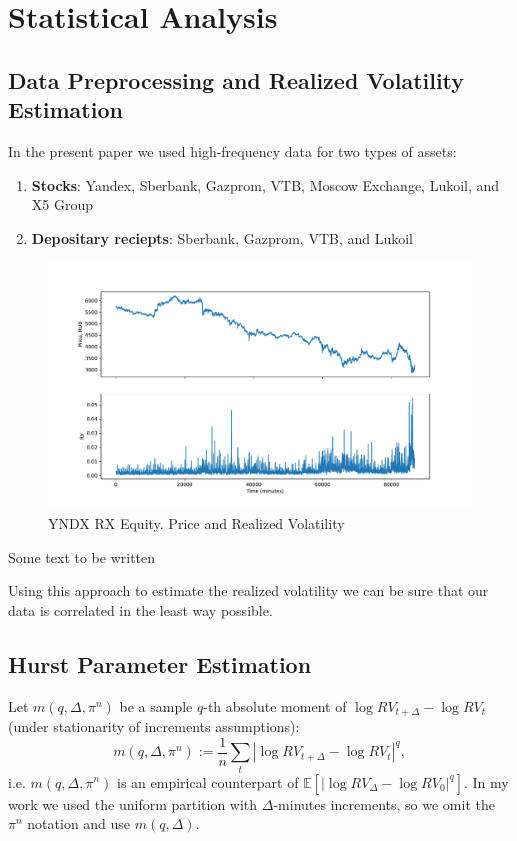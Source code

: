 \section{Statistical Analysis}
    \subsection{Data Preprocessing and Realized Volatility Estimation}
        In the present paper we used high-frequency data for two types of assets:
        \begin{enumerate}
            \item\textbf{Stocks}: Yandex, Sberbank, Gazprom, VTB, Moscow Exchange, Lukoil, and X5 Group
            \item\textbf{Depositary reciepts}: Sberbank, Gazprom, VTB, and Lukoil
        \end{enumerate}

        \begin{figure}[htbp]
            \includegraphics[width=\textwidth]{fig/YNDX RX Equity RVol.pdf}
            \caption{YNDX RX Equity. Price and Realized Volatility}
        \end{figure}

        Some text to be written

        Using this approach to estimate the realized volatility we can be sure that our data is correlated in the least way possible.

    \subsection{Hurst Parameter Estimation}
        Let $m(q, \Delta, \pi^n)$ be a sample $q$-th absolute moment of $\log RV_{t+\Delta} - \log RV_t$ 
        (under stationarity of increments assumptions):
        \begin{equation}
            m(q, \Delta, \pi^n) := \frac{1}{n} \sum_{t} \left|\log RV_{t + \Delta} - \log RV_t\right|^q,
        \end{equation}
        i.e. $m(q, \Delta, \pi^n)$ is an empirical counterpart of $\mathbb{E}\left[\left|\log RV_{\Delta} - \log RV_0\right|^q\right]$. 
        In my work we used the uniform partition with $\Delta$-minutes increments, so we omit the $\pi^n$ notation and use $m(q, \Delta)$.

